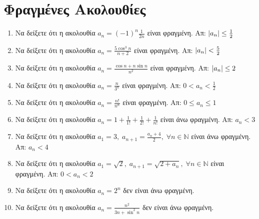 


\everymath{\displaystyle}
\pagestyle{vangelis}



\begin{center}
  \minibox[c]{\large \bfseries \textcolor{Col1}{Ακολουθίες}\\ \large 
  \textcolor{Col1}{Ασκήσεις}}
\end{center}

\vspace{\baselineskip}


\setcounter{chapter}{1}
\section{Φραγμένες Ακολουθίες}

\begin{enumerate}
  \item Να δείξετε ότι η ακολουθία $ a_{n} = (-1)^{n}\frac{1}{2n} $ είναι 
    φραγμένη.
    \hfill Απ: $ \abs{a_{n}} \leq \frac{1}{2} $ 
  \item Να δείξετε ότι η ακολουθία $ a_{n} = \frac{5 \cos^{3}{n}}{n+2} $ 
    είναι φραγμένη.
    \hfill Απ: $ \abs{a_{n}} < \frac{5}{2}  $ 
  \item Να δείξετε ότι η ακολουθία $ a_{n} = \frac{\cos{n} + n \sin{n}}{n^{2}} $ 
    είναι φραγμένη. 
    \hfill Απ: $ \abs{a_{n}} \leq 2 $ 
  \item Να δείξετε ότι η ακολουθία $ a_{n} = \frac{n}{3^{n}} $ είναι 
    φραγμένη. 
    \hfill Απ: $ 0<a_{n}< \frac{1}{2} $
  \item Να δείξετε ότι η ακολουθία $ a_{n} = \frac{n!}{n^{n}} $ είναι 
    φραγμένη. 
    \hfill Απ: $ 0 \leq a_{n} \leq 1 $ 
  \item Να δείξετε ότι η ακολουθία $ a_{n} = 1 + \frac{1}{1!} +
    \frac{1}{2!} + \frac{1}{n!} $ είναι άνω φραγμένη.
    \hfill Απ: $ a_{n} < 3 $ 
  \item Να δείξετε ότι η ακολουθία $ a_{1} = 3, \; a_{n+1} =
    \frac{a_{n}+4}{2}, \; \forall n \in \mathbb{N} $ είναι άνω φραγμένη.
    \hfill Απ: $ a_{n} < 4 $ 
  \item Να δείξετε ότι η ακολουθία $ a_{1} = \sqrt{2}, \; a_{n+1} =
    \sqrt{2+ a_{n}}, \; \forall n \in \mathbb{N} $ είναι φραγμένη.
    \hfill Απ: $ 0 < a_{n} < 2$ 
  \item Να δείξετε ότι η ακολουθία $ a_{n} = 2^{n} $ δεν είναι άνω 
    φραγμένη.
  \item Να δείξετε ότι η ακολουθία $ a_{n} = \frac{n^{2}}{3n+ \sin^{2}{n}} $ δεν 
    είναι άνω φραγμένη.
\end{enumerate}

